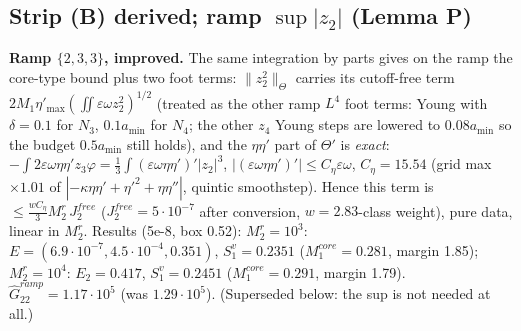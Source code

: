 \documentclass[11pt]{article}
\begin{document}
\subsection*{Strip (B) derived; ramp $\sup|z_2|$ (Lemma P)}
\textbf{Ramp $\{2,3,3\}$, improved.} The same integration by parts gives on the ramp the core-type bound plus two foot terms: $\|z_2^2\|_\Theta$ carries its cutoff-free term $2M_1\eta'_{\max}(\iint\varepsilon\omega z_2^2)^{1/2}$ (treated as the other ramp $L^4$ foot terms: Young with $\delta=0.1$ for $N_3$, $0.1a_{\min}$ for $N_4$; the other $z_4$ Young steps are lowered to $0.08a_{\min}$ so the budget $0.5a_{\min}$ still holds), and the $\eta\eta'$ part of $\Theta'$ is \emph{exact}: $-\int2\varepsilon\omega\eta\eta' z_3\varphi=\tfrac13\int(\varepsilon\omega\eta\eta')'|z_2|^3$, $|(\varepsilon\omega\eta\eta')'|\le C_\eta\varepsilon\omega$, $C_\eta=15.54$ (grid max $\times1.01$ of $|{-}\kappa\eta\eta'+\eta'^2+\eta\eta''|$, quintic smoothstep). Hence this term is $\le\frac{w C_\eta}{3}M_2^r\,J_2^{free}$ ($J_2^{free}=5\cdot10^{-7}$ after conversion, $w=2.83$-class weight), pure data, linear in $M_2^r$. Results (5e-8, box 0.52): $M_2^r=10^3$: $E=(6.9\cdot10^{-7},4.5\cdot10^{-4},0.351)$, $S_1^v=0.2351$ ($M_1^{core}=0.281$, margin 1.85); $M_2^r=10^4$: $E_2=0.417$, $S_1^v=0.2451$ ($M_1^{core}=0.291$, margin 1.79). $\hat G^{ramp}_{22}=1.17\cdot10^5$ (was $1.29\cdot10^5$). (Superseded below: the sup is not needed at all.)
\end{document}
